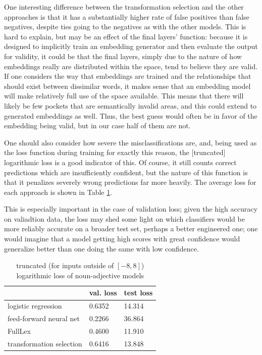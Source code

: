 \documentclass[a4paper, 12pt]{article}
\begin{document}
One interesting difference between the transformation selection and the other approaches is that it has a substantially higher rate of false positives than false negatives, despite ties going to the negatives as with the other models. This is hard to explain, but may be an effect of the final layers' function: because it is designed to implicitly train an embedding generator and then evaluate the output for validity, it could be that the final layers, simply due to the nature of how embeddings really are distributed within the space, tend to believe they are valid. If one considers the way that embeddings are trained and the relationships that should exist between dissimilar words, it makes sense that an embedding model will make relatively full use of the space available. This means that there will likely be few pockets that are semantically invalid areas, and this could extend to generated embeddings as well. Thus, the best guess would often be in favor of the embedding being valid, but in our case half of them are not.

One should also consider how severe the misclassifications are, and, being used as the loss function during training for exactly this reason, the [truncated] logarithmic loss is a good indicator of this. Of course, it still counts correct predictions which are insufficiently confident, but the nature of this function is that it penalizes severely wrong predictions far more heavily. The average loss for each approach is shown in Table \ref{loss-an}.

This is especially important in the case of validation loss; given the high accuracy on valiadtion data, the loss may shed some light on which classifiers would be more reliably accurate on a broader test set, perhaps a better engineered one; one would imagine that a model getting high scores with great confidence would generalize better than one doing the same with low confidence.

\begin{table}[]
	\centering
	\begin{tabular}{l|l|l}
		                         & val. loss & test loss \\ \hline
		logistic regression      & 0.6352    & 14.314    \\
		feed-forward neural net  & 0.2266    & 36.864    \\
		FullLex                  & 0.4600    & 11.910    \\
		transformation selection & 0.6416    & 13.848
	\end{tabular}
	\caption{truncated (for inputs outside of $[-8, 8]$) logarithmic loss of noun-adjective models}
	\label{loss-an}
\end{table}
\end{document}
